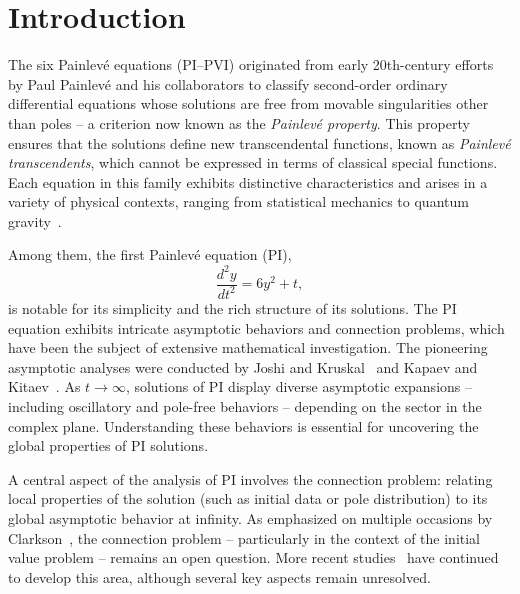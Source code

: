 \documentclass[12pt]{article}
\theoremstyle{plain}
\theoremstyle{definition}
\numberwithin{equation}{section}
\begin{document}
\section{Introduction}
The six Painlev\'e equations (PI–PVI) originated from early 20th-century efforts by Paul Painlev\'e and his collaborators to classify second-order ordinary differential equations whose solutions are free from movable singularities other than poles -- a criterion now known as the \emph{Painlev\'e property}. This property ensures that the solutions define new transcendental functions, known as \emph{Painlev\'e transcendents}, which cannot be expressed in terms of classical special functions.
Each equation in this family exhibits distinctive characteristics and arises in a variety of physical contexts, ranging from statistical mechanics to quantum gravity~\cite{Ablowitz03,BMW1973,EFIK1996,JMMS1980,Kan2002,McCoy1992, TW2011,WMTB1976}.


Among them, the first Painlev\'e equation (PI),
\begin{equation}
\label{PI equation}
\frac{d^{2}y}{dt^{2}} = 6y^2 + t,
\end{equation}
is notable for its simplicity and the rich structure of its solutions.
The PI equation exhibits intricate asymptotic behaviors and connection problems, which have been the subject of extensive mathematical investigation. The pioneering asymptotic analyses were conducted by Joshi and Kruskal~\cite{Joshi-Kruskal-1992} and Kapaev and Kitaev~\cite{Kapaev-Kitaev-1993}. As $t \to \infty$, solutions of PI display diverse asymptotic expansions -- including oscillatory and pole-free behaviors -- depending on the sector in the complex plane. Understanding these behaviors is essential for uncovering the global properties of PI solutions.

A central aspect of the analysis of PI involves the connection problem: relating local properties of the solution (such as initial data or pole distribution) to its global asymptotic behavior at infinity. As emphasized on multiple occasions by Clarkson~\cite{CPA2003,CPA2006}, the connection problem -- particularly in the context of the initial value problem -- remains an open question. More recent studies~\cite{Bender-Komijani-2015, Bender-Komijani-Wang, LongLi, LongLiWang} have continued to develop this area, although several key aspects remain unresolved.
\end{document}

